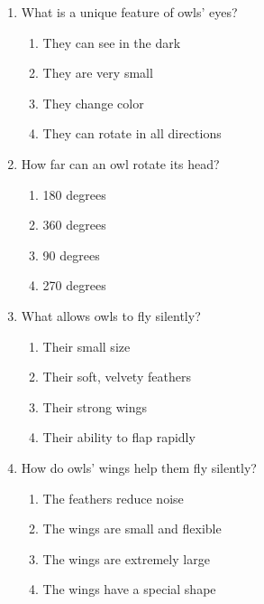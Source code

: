 \documentclass[12pt]{article}
\begin{document}
\begin{enumerate}
\vspace{0.5cm}

\item What is a unique feature of owls' eyes?
\begin{enumerate}[label=\Alph*.]
    \item They can see in the dark
    \item They are very small
    \item They change color
    \item They can rotate in all directions
\end{enumerate}

\vspace{0.5cm}

\item How far can an owl rotate its head?
\begin{enumerate}[label=\Alph*.]
    \item 180 degrees
    \item 360 degrees
    \item 90 degrees
    \item 270 degrees
\end{enumerate}

\vspace{0.5cm}

\item What allows owls to fly silently?
\begin{enumerate}[label=\Alph*.]
    \item Their small size
    \item Their soft, velvety feathers
    \item Their strong wings
    \item Their ability to flap rapidly
\end{enumerate}

\vspace{0.5cm}

\item How do owls' wings help them fly silently?
\begin{enumerate}[label=\Alph*.]
    \item The feathers reduce noise
    \item The wings are small and flexible
    \item The wings are extremely large
    \item The wings have a special shape
\end{enumerate}

\vspace{0.5cm}


\end{enumerate}
\end{document}
